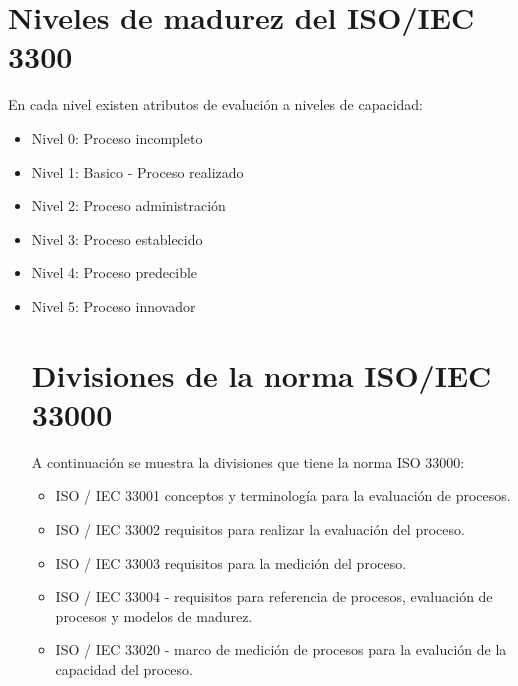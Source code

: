 \documentclass[preprint,12pt]{elsarticle}
\begin{document}
\section{Niveles de madurez del ISO/IEC 3300}
En cada nivel existen atributos de evalución a niveles de capacidad:
\\
\begin{itemize}
\item Nivel 0: Proceso incompleto
\item Nivel 1: Basico - Proceso realizado
\item Nivel 2: Proceso administración
\item Nivel 3: Proceso establecido
\item Nivel 4: Proceso predecible
\item Nivel 5: Proceso innovador
\\
\section {Divisiones de la norma ISO/IEC 33000}
A continuación se muestra la divisiones que tiene la norma ISO 33000:
\begin{itemize}
\item ISO / IEC 33001 conceptos y terminología para la evaluación de procesos.
\item ISO / IEC 33002 requisitos para realizar la evaluación del proceso.
\item ISO / IEC 33003 requisitos para la medición del proceso.
\item ISO / IEC 33004 - requisitos para referencia de procesos, evaluación de procesos y modelos de madurez.
\item ISO / IEC 33020 - marco de medición de procesos para la evalución de la capacidad del proceso.
	\end{itemize}
	\end{itemize}

\end{document}
